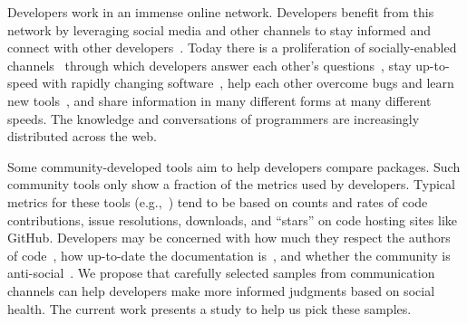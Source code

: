 Developers work in an immense online network.
Developers benefit from this network by
leveraging social media and other channels to stay informed
and connect with other developers~\cite{singer_software_2014,storey_how_2016}.
Today there is a proliferation of socially-enabled channels~\cite{storey_revolution_2014} through which developers
answer each other's questions~\cite{mamykina_fastest_2011},
stay up-to-speed with rapidly changing software~\cite{linares-vasquez_how_2014},
help each other overcome bugs and learn new tools~\cite{parnin_blogging_2013},
and share information in many different forms at many different speeds.
The knowledge and conversations of programmers are increasingly distributed across the web.

Some community-developed tools aim to help developers compare packages.
Such community tools only show a fraction of the metrics used by developers.
Typical metrics for these tools (e.g.,~\cite{awesome_python,package_quality,ruby_toolbox}) tend to be based on counts and rates of code contributions, issue resolutions, downloads, and ``stars'' on code hosting sites like GitHub.
Developers may be concerned with
how much they respect the authors of code~\cite{robillard_field_2011},
how up-to-date the documentation is~\cite{lethbridge_how_2003,nykaza_what_2002,robillard_field_2011,storey_revolution_2014},
and whether the community is anti-social~\cite{storey_revolution_2014}.
We propose that carefully selected samples from communication channels can help developers make more informed judgments based on social health.
The current work presents a study to help us pick these samples.
